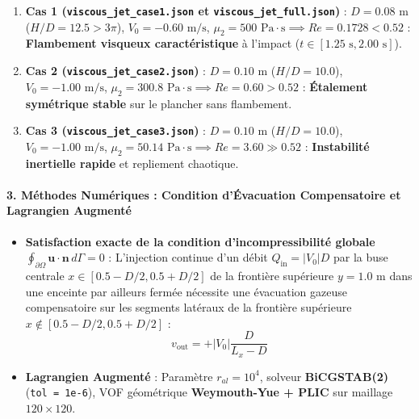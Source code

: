 \documentclass[
  10pt,
]{article}
\providecommand{\tightlist}{%
  \setlength{\itemsep}{0pt}\setlength{\parskip}{0pt}}
\begin{document}
\begin{enumerate}
\def\labelenumi{\arabic{enumi}.}
\tightlist
\item
  \textbf{Cas 1 (\texttt{viscous\_jet\_case1.json} et
  \texttt{viscous\_jet\_full.json})} : \(D = 0.08\text{ m}\)
  (\(H/D = 12.5 > 3\pi\)), \(V_0 = -0.60\text{ m/s}\),
  \(\mu_2 = 500\text{ Pa}\cdot\text{s} \implies Re = 0.1728 < 0.52\) :
  \textbf{Flambement visqueux caractéristique} à l'impact
  (\(t \in [1.25\text{ s}, 2.00\text{ s}]\)).
\item
  \textbf{Cas 2 (\texttt{viscous\_jet\_case2.json})} :
  \(D = 0.10\text{ m}\) (\(H/D = 10.0\)), \(V_0 = -1.00\text{ m/s}\),
  \(\mu_2 = 300.8\text{ Pa}\cdot\text{s} \implies Re = 0.60 > 0.52\) :
  \textbf{Étalement symétrique stable} sur le plancher sans flambement.
\item
  \textbf{Cas 3 (\texttt{viscous\_jet\_case3.json})} :
  \(D = 0.10\text{ m}\) (\(H/D = 10.0\)), \(V_0 = -1.00\text{ m/s}\),
  \(\mu_2 = 50.14\text{ Pa}\cdot\text{s} \implies Re = 3.60 \gg 0.52\) :
  \textbf{Instabilité inertielle rapide} et repliement chaotique.
\end{enumerate}

\paragraph{3. Méthodes Numériques : Condition d'Évacuation Compensatoire
et Lagrangien
Augmenté}\label{muxe9thodes-numuxe9riques-condition-duxe9vacuation-compensatoire-et-lagrangien-augmentuxe9}

\begin{itemize}
\tightlist
\item
  \textbf{Satisfaction exacte de la condition d'incompressibilité
  globale
  \(\oint_{\partial\Omega} \mathbf{u}\cdot\mathbf{n}\,d\Gamma = 0\)} :
  L'injection continue d'un débit \(Q_{\text{in}} = |V_0| D\) par la
  buse centrale \(x \in [0.5 - D/2, 0.5 + D/2]\) de la frontière
  supérieure \(y = 1.0\text{ m}\) dans une enceinte par ailleurs fermée
  nécessite une évacuation gazeuse compensatoire sur les segments
  latéraux de la frontière supérieure
  \(x \notin [0.5 - D/2, 0.5 + D/2]\) :
  \[v_{\text{out}} = + |V_0| \frac{D}{L_x - D}\]
\item
  \textbf{Lagrangien Augmenté} : Paramètre \(r_{al} = 10^4\), solveur
  \textbf{BiCGSTAB(2)} (\texttt{tol\ =\ 1e-6}), VOF géométrique
  \textbf{Weymouth-Yue + PLIC} sur maillage \(120 \times 120\).
\end{itemize}
\end{document}
